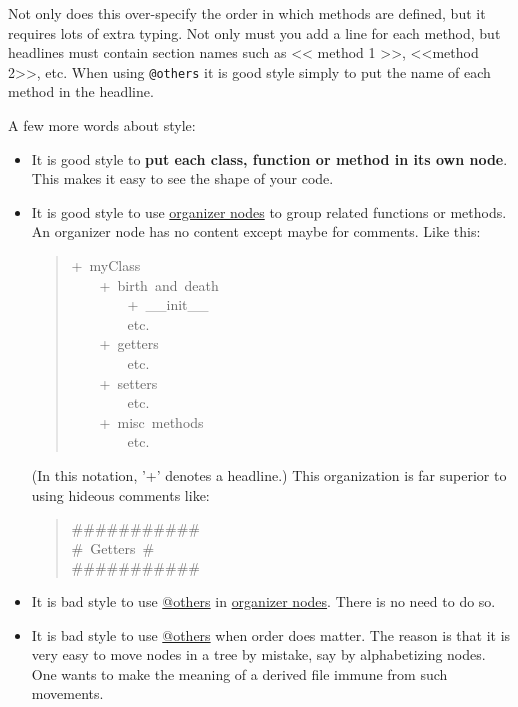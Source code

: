 \documentclass[10pt,a4paper,english]{article}
\begin{document}
Not only does this over-specify the order in which methods are defined, but it
requires lots of extra typing. Not only must you add a line for each method, but
headlines must contain section names such as {\textless}{\textless} method 1 {\textgreater}{\textgreater}, {\textless}{\textless}method 2{\textgreater}{\textgreater}, etc.
When using \texttt{@others} it is good style simply to put the name of each method in
the headline.

A few more words about style:
\begin{itemize}
\item {} 
It is good style to \textbf{put each class, function or method in its own node}.
This makes it easy to see the shape of your code.

\item {} 
It is good style to use \href{glossary.html\#organizer-nodes}{organizer nodes} to group related functions or methods.
An organizer node has no content except maybe for comments.
Like this:
\begin{quote}{\ttfamily \raggedright \noindent
+~myClass~\\
~~~~+~birth~and~death~\\
~~~~~~~~+~{\_}{\_}init{\_}{\_}~\\
~~~~~~~~etc.~\\
~~~~+~getters~\\
~~~~~~~~etc.~\\
~~~~+~setters~\\
~~~~~~~~etc.~\\
~~~~+~misc~methods~\\
~~~~~~~~etc.
}\end{quote}

(In this notation, '+' denotes a headline.)
This organization is far superior to using hideous comments like:
\begin{quote}{\ttfamily \raggedright \noindent
{\#}{\#}{\#}{\#}{\#}{\#}{\#}{\#}{\#}{\#}{\#}~\\
{\#}~Getters~{\#}~\\
{\#}{\#}{\#}{\#}{\#}{\#}{\#}{\#}{\#}{\#}{\#}
}\end{quote}

\item {} 
It is bad style to use \href{glossary.html\#others}{@others} in \href{glossary.html\#organizer-nodes}{organizer nodes}.
There is no need to do so.

\item {} 
It is bad style to use \href{glossary.html\#others}{@others} when order does matter.
The reason is that it is very easy to move nodes in a tree by mistake,
say by alphabetizing nodes.
One wants to make the meaning of a derived file immune from such movements.

\end{itemize}
\end{document}
